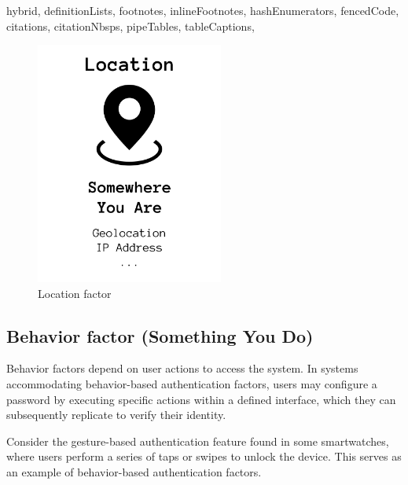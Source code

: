 \documentclass[
  digital,     %
  oneside,     %
  nosansbold,  %
  nocolorbold, %
  lof,         %
  lot,         %
]{fithesis4}
\begin{document}
\begin{markdown*}{%
  hybrid,
  definitionLists,
  footnotes,
  inlineFootnotes,
  hashEnumerators,
  fencedCode,
  citations,
  citationNbsps,
  pipeTables,
  tableCaptions,
}
\begin{figure}[htbp]
  \centering
  \includegraphics[width=0.55\textwidth]{img/location-final.png}
  \caption{Location factor}
  \label{fig:location-factor}
\end{figure}

\newpage
\subsection{Behavior factor (Something You Do)}
Behavior factors depend on user actions to access the system. In systems accommodating behavior-based authentication factors, users may configure a password by executing specific actions within a defined interface, which they can subsequently replicate to verify their identity.

Consider the gesture-based authentication feature found in some smartwatches, where users perform a series of taps or swipes to unlock the device. This serves as an example of behavior-based authentication factors.\cite{auth-factors-sumologic} \cite{auth-factors-globalknowledge} \cite{auth-factors-aratek}


\end{markdown*}
\end{document}
